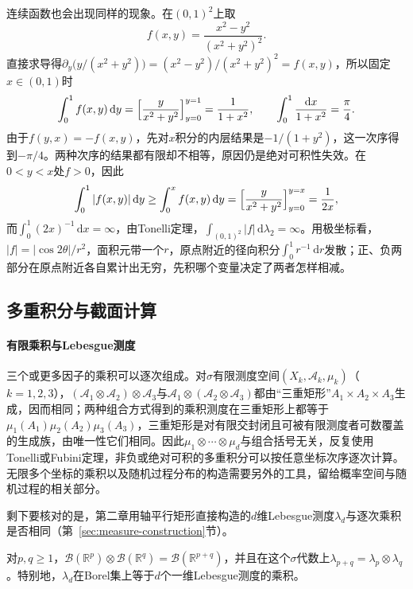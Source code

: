 连续函数也会出现同样的现象。在$(0,1)^2$上取
\[
 f(x,y)=\frac{x^2-y^2}{(x^2+y^2)^2}.
\]
直接求导得$\partial_y\bigl(y/(x^2+y^2)\bigr)=(x^2-y^2)/(x^2+y^2)^2=f(x,y)$，所以固定$x\in(0,1)$时
\[
 \int_0^1f(x,y)\,\mathrm dy=\Bigl[\frac{y}{x^2+y^2}\Bigr]_{y=0}^{y=1}=\frac1{1+x^2},
 \qquad
 \int_0^1\frac{\mathrm dx}{1+x^2}=\frac\pi4.
\]
由于$f(y,x)=-f(x,y)$，先对$x$积分的内层结果是$-1/(1+y^2)$，这一次序得到$-\pi/4$。两种次序的结果都有限却不相等，原因仍是绝对可积性失效。在$0<y<x$处$f>0$，因此
\[
 \int_0^1|f(x,y)|\,\mathrm dy\ge\int_0^xf(x,y)\,\mathrm dy=\Bigl[\frac{y}{x^2+y^2}\Bigr]_{y=0}^{y=x}=\frac1{2x},
\]
而$\int_0^1(2x)^{-1}\,\mathrm dx=\infty$，由Tonelli定理，$\int_{(0,1)^2}|f|\,\mathrm d\lambda_2=\infty$。用极坐标看，$|f|=|\cos2\theta|/r^2$，面积元带一个$r$，原点附近的径向积分$\int_0^1r^{-1}\,\mathrm dr$发散；正、负两部分在原点附近各自累计出无穷，先积哪个变量决定了两者怎样相减。

\subsection{多重积分与截面计算}
\label{sec:integral-multiple}

\paragraph{有限乘积与Lebesgue测度}
三个或更多因子的乘积可以逐次组成。对$\sigma$有限测度空间$(X_k,\mathcal A_k,\mu_k)$（$k=1,2,3$），$(\mathcal A_1\otimes\mathcal A_2)\otimes\mathcal A_3$与$\mathcal A_1\otimes(\mathcal A_2\otimes\mathcal A_3)$都由“三重矩形”$A_1\times A_2\times A_3$生成，因而相同；两种组合方式得到的乘积测度在三重矩形上都等于$\mu_1(A_1)\mu_2(A_2)\mu_3(A_3)$，三重矩形是对有限交封闭且可被有限测度者可数覆盖的生成族，由唯一性它们相同。因此$\mu_1\otimes\cdots\otimes\mu_d$与组合括号无关，反复使用Tonelli或Fubini定理，非负或绝对可积的多重积分可以按任意坐标次序逐次计算。无限多个坐标的乘积以及随机过程分布的构造需要另外的工具，留给概率空间与随机过程的相关部分。

剩下要核对的是，第二章用轴平行矩形直接构造的$d$维Lebesgue测度$\lambda_d$与逐次乘积是否相同（第~\ref{sec:measure-construction}节）。

\begin{theorem}[Lebesgue测度与乘积测度相容]
\label{thm:integral-lebesgue-product}
对$p,q\ge1$，$\mathcal B(\mathbb R^p)\otimes\mathcal B(\mathbb R^q)=\mathcal B(\mathbb R^{p+q})$，并且在这个$\sigma$代数上$\lambda_{p+q}=\lambda_p\otimes\lambda_q$。特别地，$\lambda_d$在Borel集上等于$d$个一维Lebesgue测度的乘积。
\end{theorem}

